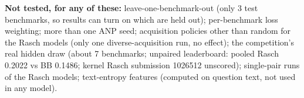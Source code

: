 \documentclass[10pt]{extarticle}
\begin{document}
\vspace{4pt}
{\footnotesize\textbf{Not tested, for any of these:} leave-one-benchmark-out (only 3 test benchmarks, so results can turn on which are held out); per-benchmark loss weighting; more than one ANP seed; acquisition policies other than random for the Rasch models (only one diverse-acquisition run, no effect); the competition's real hidden draw (about 7 benchmarks; unpaired leaderboard: pooled Rasch 0.2022 vs BB 0.1486; kernel Rasch submission 1026512 unscored); single-pair runs of the Rasch models; text-entropy features (computed on question text, not used in any model).}
\end{document}
